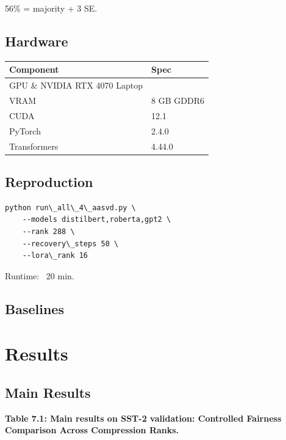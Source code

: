 56\% = majority + 3 SE.

\subsection{Hardware}

\begin{table}[H]
\centering
\small
\begin{tabular}{ll}
\toprule
\textbf{Component} & \textbf{Spec} \\
\midrule
GPU \& NVIDIA RTX 4070 Laptop \\
VRAM & 8 GB GDDR6 \\
CUDA & 12.1 \\
PyTorch & 2.4.0 \\
Transformers & 4.44.0 \\
\bottomrule
\end{tabular}
\end{table}

\subsection{Reproduction}

\begin{lstlisting}
python run\_all\_4\_aasvd.py \
    --models distilbert,roberta,gpt2 \
    --rank 288 \
    --recovery\_steps 50 \
    --lora\_rank 16
\end{lstlisting}

Runtime: ~20 min.

\subsection{Baselines}



\section{Results}

\subsection{Main Results}

\textbf{Table 7.1: Main results on SST-2 validation: Controlled Fairness Comparison Across Compression Ranks.}

